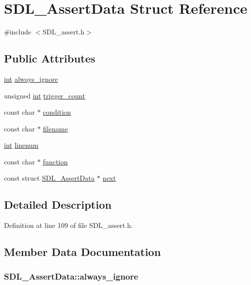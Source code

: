 \hypertarget{struct_s_d_l___assert_data}{\section{S\-D\-L\-\_\-\-Assert\-Data Struct Reference}
\label{struct_s_d_l___assert_data}
}


{\ttfamily \#include $<$S\-D\-L\-\_\-assert.\-h$>$}

\subsection*{Public Attributes}
\begin{DoxyCompactItemize}
\item 
\hyperlink{_s_d_l__thread_8h_a6a64f9be4433e4de6e2f2f548cf3c08e}{int} \hyperlink{struct_s_d_l___assert_data_a825e1c7772fe24afad33d0afc42cf04c}{always\-\_\-ignore}
\item 
unsigned \hyperlink{_s_d_l__thread_8h_a6a64f9be4433e4de6e2f2f548cf3c08e}{int} \hyperlink{struct_s_d_l___assert_data_a230bbcc2d115aab04cf817773e08eb5b}{trigger\-\_\-count}
\item 
const char $\ast$ \hyperlink{struct_s_d_l___assert_data_aec6d372462fa8c94a9d04c1168cd38c9}{condition}
\item 
const char $\ast$ \hyperlink{struct_s_d_l___assert_data_acf27f593e6a436386d2cbcf826cf1ef7}{filename}
\item 
\hyperlink{_s_d_l__thread_8h_a6a64f9be4433e4de6e2f2f548cf3c08e}{int} \hyperlink{struct_s_d_l___assert_data_ad026d8573970d2402230d5fa3c550b0f}{linenum}
\item 
const char $\ast$ \hyperlink{struct_s_d_l___assert_data_a4913c57d4affb813feea82fc5f48a25c}{function}
\item 
const struct \hyperlink{struct_s_d_l___assert_data}{S\-D\-L\-\_\-\-Assert\-Data} $\ast$ \hyperlink{struct_s_d_l___assert_data_a2081dcf06dce4df497e423bccddfc099}{next}
\end{DoxyCompactItemize}


\subsection{Detailed Description}


Definition at line 109 of file S\-D\-L\-\_\-assert.\-h.



\subsection{Member Data Documentation}
\hypertarget{struct_s_d_l___assert_data_a825e1c7772fe24afad33d0afc42cf04c}{
\subsubsection[{always\-\_\-ignore}]{ S\-D\-L\-\_\-\-Assert\-Data\-::always\-\_\-ignore}}\label{struct_s_d_l___assert_data_a825e1c7772fe24afad33d0afc42cf04c}


